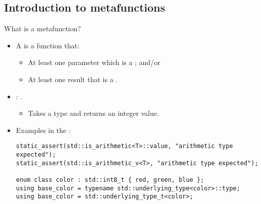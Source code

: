 \subsection{Introduction to metafunctions}

\begin{frame}[t,fragile]{What is a metafunction?}
\begin{itemize}
  \item A  is a function that:
    \begin{itemize}
      \item At least  one parameter which is a ; and/or
      \item At least  one result that is a .
    \end{itemize}

  \item {}: .
    \begin{itemize}
      \item Takes a type and returns an integer value.
    \end{itemize}

  \item Examples in the :
\begin{lstlisting}
static_assert(std::is_arithmetic<T>::value, "arithmetic type expected");
static_assert(std::is_arithmetic_v<T>, "arithmetic type expected");

enum class color : std::int8_t { red, green, blue };
using base_color = typename std::underlying_type<color>::type;
using base_color = std::underlying_type_t<color>;
\end{lstlisting}

\end{itemize}
\end{frame}

